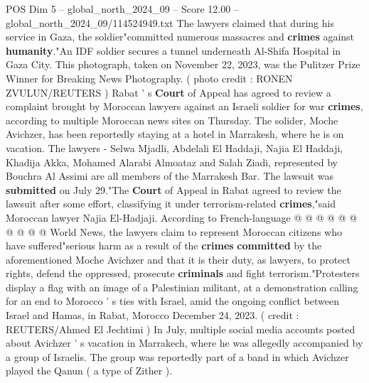 \begin{textsample}{POS Dim 5 – global\_north\_2024\_09 – Score 12.00 – global\_north\_2024\_09/114524949.txt}  \label{ex:f5_pos_359}
The lawyers claimed that during his service in Gaza, the soldier"committed numerous massacres and \textbf{crimes} against \textbf{humanity}."An IDF soldier secures a tunnel underneath Al-Shifa Hospital in Gaza City.
This photograph, taken on November 22, 2023, was the Pulitzer Prize Winner for Breaking News Photography. ( photo credit : RONEN ZVULUN/REUTERS ) Rabat ' s \textbf{Court} of Appeal has agreed to review a complaint brought by Moroccan lawyers against an Israeli soldier for war \textbf{crimes}, according to multiple Moroccan news sites on Thursday.
The solider, Moche Avichzer, has been reportedly staying at a hotel in Marrakesh, where he is on vacation.
The lawyers - Selwa Mjadli, Abdelali El Haddaji, Najia El Haddaji, Khadija Akka, Mohamed Alarabi Almoataz and Salah Ziadi, represented by Bouchra Al Assimi are all members of the Marrakesh Bar.
The lawsuit was \textbf{submitted} on July 29."The \textbf{Court} of Appeal in Rabat agreed to review the lawsuit after some effort, classifying it under terrorism-related \textbf{crimes},"said Moroccan lawyer Najia El-Hadjaji.
According to French-language @ @ @ @ @ @ @ @ @ @ World News, the lawyers claim to represent Moroccan citizens who have suffered"serious harm as a result of the \textbf{crimes} \textbf{committed} by the aforementioned Moche Avichzer and that it is their duty, as lawyers, to protect rights, defend the oppressed, prosecute \textbf{criminals} and fight terrorism."Protesters display a flag with an image of a Palestinian militant, at a demonstration calling for an end to Morocco ' s ties with Israel, amid the ongoing conflict between Israel and Hamas, in Rabat, Morocco December 24, 2023. ( credit : REUTERS/Ahmed El Jechtimi ) In July, multiple social media accounts posted about Avichzer ' s vacation in Marrakech, where he was allegedly accompanied by a group of Israelis.
The group was reportedly part of a band in which Avichzer played the Qanun ( a type of Zither ).

\end{textsample}
